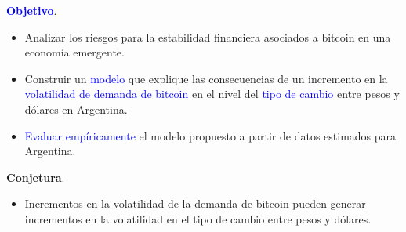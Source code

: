 \begin{frame}{}

    \textcolor{blue}{\textbf{Objetivo}}.\\
    \vspace{5mm}
    \begin{itemize}
        \setlength\itemsep{1em}
        \item[] Analizar los riesgos para la estabilidad financiera asociados a bitcoin en una economía emergente. 
        \item[] Construir un \textcolor{blue}{modelo} que explique las consecuencias de un incremento en la \textcolor{blue}{volatilidad de demanda de bitcoin} en el nivel del \textcolor{blue}{tipo de cambio} entre pesos y dólares en Argentina.
        \item[] \textcolor{blue}{Evaluar empíricamente} el modelo propuesto a partir de datos estimados para Argentina.
    \end{itemize}
 
    \vspace{5mm}
    \textcolor{dgreen}{\textbf{Conjetura}}. 
    \vspace{5mm}
    \begin{itemize}
    \item[] Incrementos en la  \textcolor{dgreen}{volatilidad de la demanda de bitcoin} pueden generar incrementos en la  \textcolor{dgreen}{volatilidad en el tipo de cambio} entre pesos y dólares.
    \end{itemize}

    
\end{frame}

